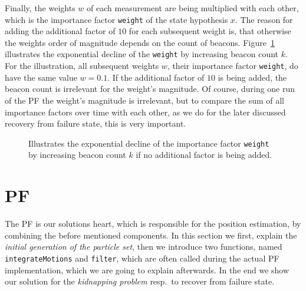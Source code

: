 Finally, the weights $w$ of each measurement are being multiplied with each other, which is the importance factor \texttt{weight} of the state hypothesis $x$. The reason for adding the additional factor of $10$ for each subsequent weight is, that otherwise the weights order of magnitude depends on the count of beacons. Figure~\ref{fig:addWeightFactor} illustrates the exponential decline of the \texttt{weight} by increasing beacon count $k$. For the illustration, all subsequent weights $w$, their importance factor \texttt{weight}, do have the same value  $w = 0.1$. If the additional factor of $10$ is being added, the beacon count is irrelevant for the weight's magnitude. Of course, during one run of the \acl{PF} the weight's magnitude is irrelevant, but to compare the sum of all importance factors over time with each other, as we do for the later discussed recovery from failure state, this is very important.

\begin{figure}


\caption{Illustrates the exponential decline of the importance factor \texttt{weight} by increasing beacon count $k$ if no additional factor is being added.}
\label{fig:addWeightFactor}
\end{figure}


\section{\acl{PF}}
The \acl{PF} is our solutions heart, which is responsible for the position estimation, by combining the before mentioned components. In this section we first, explain the \emph{initial generation of the particle set}, then we introduce two functions, named \texttt{integrateMotions} and \texttt{filter}, which are often called during the actual \acs{PF} implementation, which we are going to explain afterwards. In the end we show our solution for the \emph{kidnapping problem} resp.\ to recover from failure state.


